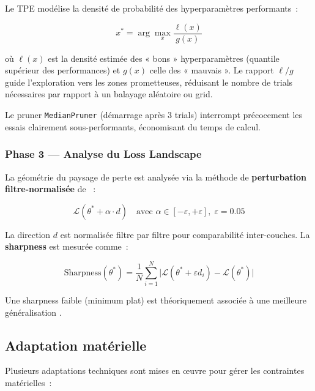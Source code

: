 \documentclass[12pt,a4paper]{article}
\begin{document}
Le TPE modélise la densité de probabilité des hyperparamètres performants~:

\begin{equation}
  \label{eq:tpe}
  x^* = \arg\max_{x} \frac{\ell(x)}{g(x)}
\end{equation}

où $\ell(x)$ est la densité estimée des « bons » hyperparamètres (quantile
supérieur des performances) et $g(x)$ celle des « mauvais ». Le rapport $\ell/g$
guide l'exploration vers les zones prometteuses, réduisant le nombre de
trials nécessaires par rapport à un balayage aléatoire ou grid.

Le pruner \texttt{MedianPruner} (démarrage après 3 trials) interrompt précocement
les essais clairement sous-performants, économisant du temps de calcul.

\subsubsection{Phase 3 — Analyse du Loss Landscape}

La géométrie du paysage de perte est analysée via la méthode de \textbf{perturbation
filtre-normalisée} de \citet{li2018visualizing}~:

\begin{equation}
  \label{eq:landscape}
  \mathcal{L}(\theta^* + \alpha \cdot d) \quad
  \text{avec } \alpha \in [-\varepsilon, +\varepsilon], \; \varepsilon = 0.05
\end{equation}

La direction $d$ est normalisée filtre par filtre pour comparabilité inter-couches.
La \textbf{sharpness} est mesurée comme~:

\begin{equation}
  \label{eq:sharpness}
  \text{Sharpness}(\theta^*) = \frac{1}{N} \sum_{i=1}^{N}
  \bigl|\mathcal{L}(\theta^* + \varepsilon d_i) - \mathcal{L}(\theta^*)\bigr|
\end{equation}

Une sharpness faible (minimum plat) est théoriquement associée à une meilleure
généralisation \citep{hochreiter1997flat, keskar2017large}.

\subsection{Adaptation matérielle}
\label{ssec:materiel}

Plusieurs adaptations techniques sont mises en œuvre pour gérer les contraintes
matérielles~:
\end{document}
